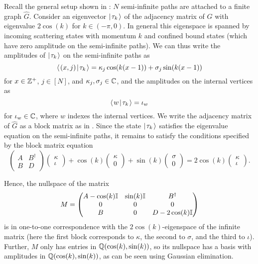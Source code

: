 \documentclass[../thesis-main/thesis-main]{subfiles}
\begin{document}
Recall the general setup shown in : $N$ semi-infinite paths are attached to a finite graph $\hat G$. Consider an eigenvector $|\mspace{2mu} \tau_k \mspace{2mu} \rangle$ of the adjacency matrix of $G$ with eigenvalue $2\cos(k)$ for $k\in (-\pi,0)$. In general this eigenspace is spanned by incoming scattering states with momentum $k$ and confined bound states \cite{CG12} (which have zero amplitude on the semi-infinite paths). We can thus write the amplitudes of $|\mspace{2mu} \tau_k \mspace{2mu} \rangle$ on the semi-infinite paths as
\[
  \langle\mspace{2mu} (x,j) \mspace{2mu} | \mspace{2mu} \tau_k\mspace{2mu} \rangle 
  = \kappa_j \cos(k (x-1)) + \sigma_j \sin(k (x-1))
\]
for $x \in \mathbb{Z}^+$, $j \in [N]$, and $\kappa_j,\sigma_j \in \mathbb{C}$, and the amplitudes on the internal vertices as
\[
  \langle\mspace{2mu} w \mspace{2mu} | \mspace{2mu} \tau_k\mspace{2mu} \rangle = \iota_w
\]
for $\iota_w \in \mathbb{C}$, where $w$ indexes the internal vertices. We write the adjacency matrix of $\hat{G}$ as a block matrix as in .  Since the state $|\mspace{2mu} \tau_k \mspace{2mu} \rangle$ satisfies the eigenvalue equation on the semi-infinite paths, it remains to satisfy the conditions specified by the block matrix equation
\begin{equation*}
  \begin{pmatrix} A & B^\dag\\ B & D\end{pmatrix}
	\begin{pmatrix} \kappa \\ \iota \end{pmatrix}
	+ \cos(k) \begin{pmatrix} \kappa \\ 0 \end{pmatrix}
	+ \sin(k) \begin{pmatrix} \sigma \\ 0 \end{pmatrix} 
	= 2\cos(k) \begin{pmatrix} \kappa \\ \iota \end{pmatrix}.
\end{equation*}

Hence, the nullspace of the matrix
\[
  M= \begin{pmatrix} A -\cos(k) \mathbb{I} & \sin(k) \mathbb{I} & B^\dag\\
    0 & 0 & 0\\
    B & 0 & D-2\cos(k)\mathbb{I}\end{pmatrix}
\]
is in one-to-one correspondence with the $2\cos(k)$-eigenspace of the infinite matrix (here the first block corresponds to $\kappa$, the second to $\sigma$, and the third to $\iota$). Further, $M$ only has entries in $\mathbb{Q}(\cos(k),\sin(k))$, so its nullspace has a basis with amplitudes in $\mathbb{Q}(\cos(k),\sin(k))$, as can be seen using Gaussian elimination.
\end{document}
